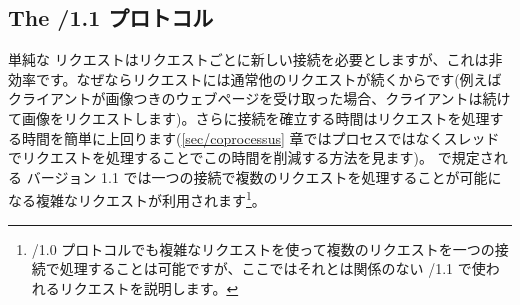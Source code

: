 \subsection*{The {\normalfont \http/1.1} プロトコル}

単純な \http リクエストはリクエストごとに新しい接続を必要としますが、これは非効率です。なぜならリクエストには通常他のリクエストが続くからです(例えばクライアントが画像つきのウェブページを受け取った場合、クライアントは続けて画像をリクエストします)。さらに接続を確立する時間はリクエストを処理する時間を簡単に上回ります(\ref{sec/coprocessus} 章ではプロセスではなくスレッドでリクエストを処理することでこの時間を削減する方法を見ます)。 で規定される \http バージョン 1.1 では一つの接続で複数のリクエストを処理することが可能になる複雑なリクエストが利用されます\footnote{\http/1.0 プロトコルでも複雑なリクエストを使って複数のリクエストを一つの接続で処理することは可能ですが、ここではそれとは関係のない \http/1.1 で使われるリクエストを説明します。}。

